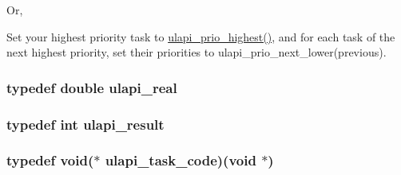 Or,

Set your highest priority task to \hyperlink{ulapi_8cpp_ad8bced2eff1e366df83624e4c785bf14}{ulapi\_\-prio\_\-highest()}, and for each task of the next highest priority, set their priorities to ulapi\_\-prio\_\-next\_\-lower(previous). \hypertarget{ulapi_8hh_ac6e0274fd91c3dcd00a8802d6c5cfcb1}{
\subsubsection[{ulapi\_\-real}]{\setlength{\rightskip}{0pt plus 5cm}typedef double {\bf ulapi\_\-real}}}
\label{ulapi_8hh_ac6e0274fd91c3dcd00a8802d6c5cfcb1}
\hypertarget{ulapi_8hh_a02d216952303bc6dda8fde2827a2a01f}{
\subsubsection[{ulapi\_\-result}]{\setlength{\rightskip}{0pt plus 5cm}typedef int {\bf ulapi\_\-result}}}
\label{ulapi_8hh_a02d216952303bc6dda8fde2827a2a01f}
\hypertarget{ulapi_8hh_ac79adb6e96f2644e1d3debb59e6390c8}{
\subsubsection[{ulapi\_\-task\_\-code}]{\setlength{\rightskip}{0pt plus 5cm}typedef void($\ast$ {\bf ulapi\_\-task\_\-code})(void $\ast$)}}
\label{ulapi_8hh_ac79adb6e96f2644e1d3debb59e6390c8}


